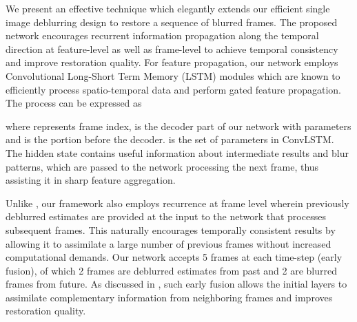 \documentclass[10pt,twocolumn,letterpaper]{article}
\begin{document}
We present an effective technique which elegantly extends our efficient single image deblurring design to restore a sequence of blurred frames. The proposed network encourages recurrent information propagation along the temporal direction  at feature-level as well as frame-level to achieve temporal consistency and improve restoration quality. For feature propagation, our network employs Convolutional Long-Short Term Memory (LSTM) modules \cite{xingjian2015convolutional} which are known to efficiently process spatio-temporal data and perform gated feature propagation. The process can be expressed as

where  represents frame index,  is the decoder part of our network with parameters  and  is the portion before the decoder.  is the set of parameters in ConvLSTM. The hidden state  contains useful information about intermediate results and blur patterns, which are passed to the network processing the next frame, thus assisting it in sharp feature aggregation.

 Unlike \cite{su2017deep,hyun2017online}, our framework also employs recurrence at frame level wherein previously deblurred estimates are provided at the input to the network that processes subsequent frames. This naturally encourages temporally consistent results by allowing it to assimilate a large number of previous frames without increased computational demands. Our network accepts 5 frames at each time-step (early fusion), of which 2 frames are deblurred estimates from past and 2 are blurred frames from future. As discussed in \cite{caballero2017real}, such early fusion allows the initial layers to assimilate complementary information from neighboring frames and improves restoration quality.
\end{document}
